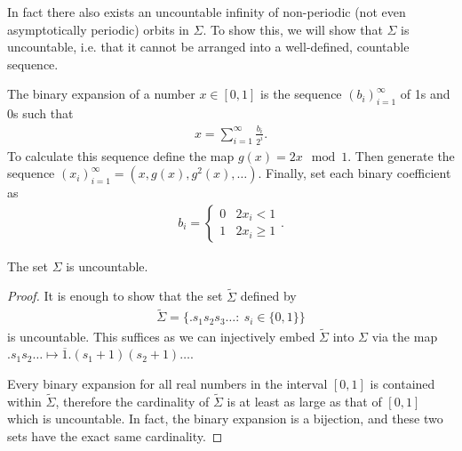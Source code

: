 In fact there also exists an uncountable infinity of non-periodic (not even asymptotically periodic) orbits in $\Sigma$. To show this, we will show that $\Sigma$ is uncountable, i.e. that it cannot be arranged into a well-defined, countable sequence.
\begin{definition}
	The binary expansion of a number $x\in [0,1]$ is the sequence $(b_i)_{i=1}^{\infty }$ of 1s and 0s  such that 
	\begin{align}
		x = \sum_{i=1}^{\infty } \frac{b_i}{2^i}.
	\end{align}
	To calculate this sequence define the map $g(x) = 2x \mod 1$. Then generate the sequence $(x_i)_{i=1}^{\infty }=(x, g(x), g^2(x), \ldots)$. Finally, set each binary coefficient as
	 \begin{align}
		b_i =
		\begin{cases}
			0 & 2x_i < 1 \\
			1 & 2x_i \geq 1
		\end{cases}.
	\end{align}
	
\end{definition}
\begin{proposition}[]
	The set $\Sigma$ is uncountable.
\end{proposition}
\begin{proof}
	It is enough to show that the set $\tilde{\Sigma}$ defined by 
	 \begin{align}
		 \tilde{\Sigma} = \{ \bm{.} s_1s_2s_3 \ldots:\ s_i\in \{0,1\}\}
	\end{align}
	is uncountable. This suffices as we can injectively embed $\tilde{\Sigma}$ into $\Sigma$ via the map $\bm{.} s_1s_2\ldots \mapsto \overline{1}\bm{.} (s_1+1)(s_2+1)\ldots$.

	Every binary expansion for all real numbers in the interval $[0,1]$ is contained within $\tilde{\Sigma}$, therefore the cardinality of $\tilde{\Sigma}$ is at least as large as that of $[0,1]$ which is uncountable. In fact, the binary expansion is a bijection, and these two sets have the exact same cardinality. 
\end{proof}

